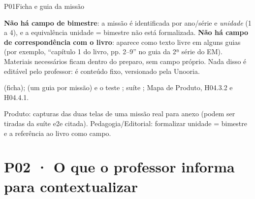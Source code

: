 \begin{resposta}{P01}{Ficha e guia da missão}{\implementado}
\begin{campos}
  \item[Limitações] \textbf{Não há campo de bimestre}: a missão é identificada
    por ano/série e \emph{unidade} (1 a 4), e a equivalência unidade =
    bimestre não está formalizada. \textbf{Não há campo de correspondência
    com o livro}: aparece como texto livre em alguns guias (por exemplo,
    ``capítulo 1 do livro, pp. 2--9'' no guia da 2ª série do EM). Materiais
    necessários ficam dentro do preparo, sem campo próprio. Nada disso é
    editável pelo professor: é conteúdo fixo, versionado pela Unooria.
  \item[Evidência]  (ficha);
     (um guia por missão) e o teste
    ; suíte ;
    Mapa de Produto, H04.3.2 e H04.4.1.
  \item[Lacuna] Produto: capturas das duas telas de uma missão real para anexo
    (podem ser tiradas da suíte e2e citada). Pedagogia/Editorial: formalizar
    unidade = bimestre e a referência ao livro como campo.
\end{campos}
\end{resposta}

\section{P02 · O que o professor informa para contextualizar}
\label{sec:p02}


